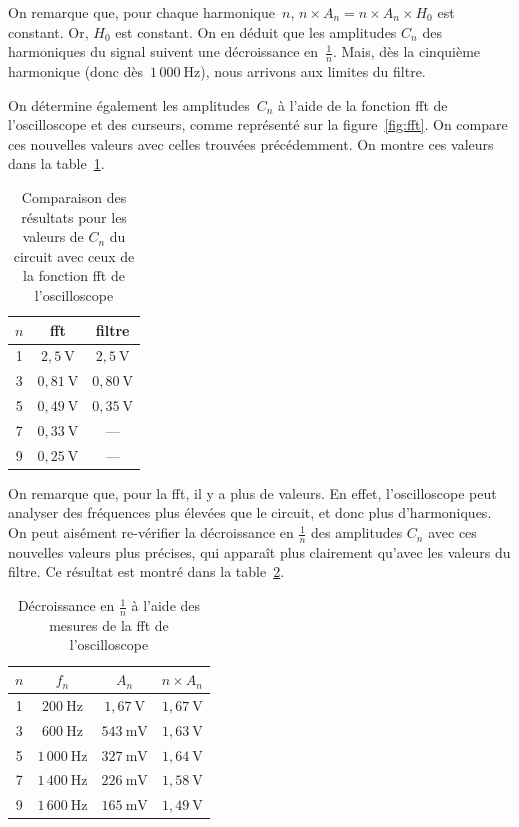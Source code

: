 \documentclass[a4paper,twocolumn]{article}
\begin{document}
	On remarque que, pour chaque harmonique~$n$, $n \times A_n = n \times A_n \times H_0$\/ est constant. Or, $H_0$\/ est constant. On en déduit que les amplitudes $C_n$\/ des harmoniques du signal suivent une décroissance en~$\frac{1}{n}$. Mais, dès la cinquième harmonique (donc dès~$1\,000\:\mathrm{Hz}$), nous arrivons aux limites du filtre.

	On détermine également les amplitudes~$C_n$\/ à l'aide de la fonction {\sc fft}\/ de l'oscilloscope et des curseurs, comme représenté sur la figure~\ref{fig:fft}.
	On compare ces nouvelles valeurs avec celles trouvées précédemment.
	On montre ces valeurs dans la table~\ref{tab:res2}.

	\begin{table}[H]
		\centering
		\begin{tabular}{|c|c|c|}
			\hline
			$n$&\sc fft&\sc filtre\\\hline
			1&$2{,}5\:\mathrm{V}$&$2{,}5\:\mathrm{V}$\\
			3&$0{,}81\:\mathrm{V}$&$0{,}80\:\mathrm{V}$\\
			5&$0{,}49\:\mathrm{V}$&$0{,}35\:\mathrm{V}$\\
			7&$0{,}33\:\mathrm{V}$&---\\
			9&$0{,}25\:\mathrm{V}$&---\\ \hline
		\end{tabular}
		\caption{Comparaison des résultats pour les valeurs de $C_n$\/ du circuit avec ceux de la fonction {\sc fft}\/ de l'oscilloscope}
		\label{tab:res2}
	\end{table}

	On remarque que, pour la {\sc fft}, il y a plus de valeurs. En effet, l'oscilloscope peut analyser des fréquences plus élevées que le circuit, et donc plus d'harmoniques. On peut aisément re-vérifier la décroissance en $\frac{1}{n}$\/ des amplitudes $C_n$\/ avec ces nouvelles valeurs plus précises, qui apparaît plus clairement qu'avec les valeurs du filtre. Ce résultat est montré dans la table~\ref{tab:res3}.

	\begin{table}[H]
		\centering
		\begin{tabular}{|c|c|c|c|}
			\hline
			$n$&$f_n$&$A_n$&$n\times A_n$\\ \hline
			1&$200\:\mathrm{Hz}$&$1{,}67\:\mathrm{V}$&$1{,}67\:\mathrm{V}$\\
			3&$600\:\mathrm{Hz}$&$543\:\mathrm{mV}$&$1{,}63\:\mathrm{V}$\\
			5&$1\,000\:\mathrm{Hz}$&$327\:\mathrm{mV}$&$1{,}64\:\mathrm{V}$\\
			7&$1\,400\:\mathrm{Hz}$&$226\:\mathrm{mV}$&$1{,}58\:\mathrm{V}$\\
			9&$1\,600\:\mathrm{Hz}$&$165\:\mathrm{mV}$&$1{,}49\:\mathrm{V}$\\
			\hline
		\end{tabular}
		\caption{Décroissance en $\frac{1}{n}$\/ à l'aide des mesures de la {\sc fft}\/ de l'oscilloscope}
		\label{tab:res3}
	\end{table}
\end{document}
